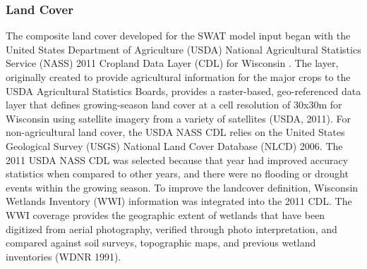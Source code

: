 \subsubsection{Land Cover}\label{sec:land_cover}
The composite land cover developed for the SWAT model input began with the United States Department of Agriculture (USDA) National Agricultural Statistics Service (NASS) 2011 Cropland Data Layer (CDL) for Wisconsin \cite{usda_cdl_2011}. The layer, originally created to provide agricultural information for the major crops to the USDA Agricultural Statistics Boards, provides a raster-based, geo-referenced data layer that defines growing-season land cover at a cell resolution of 30x30m for Wisconsin using satellite imagery from a variety of satellites (USDA, 2011). For non-agricultural land cover, the USDA NASS CDL relies on the United States Geological Survey (USGS) National Land Cover Database (NLCD) 2006. The 2011 USDA NASS CDL was selected because that year had improved accuracy statistics when compared to other years, and there were no flooding or drought events within the growing season. To improve the landcover definition, Wisconsin Wetlands Inventory (WWI) information was integrated into the 2011 CDL. The WWI coverage provides the geographic extent of wetlands that have been digitized from aerial photography, verified through photo interpretation, and compared against soil surveys, topographic maps, and previous wetland inventories (WDNR 1991).